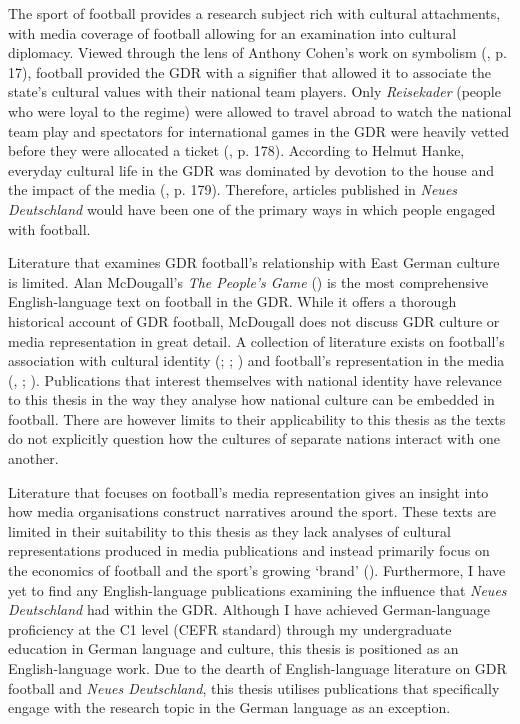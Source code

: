 The sport of football provides a research subject rich with cultural attachments, with media coverage of football allowing for an examination into cultural diplomacy. Viewed through the lens of Anthony Cohen’s work on symbolism (\cite{cohen1985}, p. 17), football provided the GDR with a signifier that allowed it to associate the state’s cultural values with their national team players. Only \textit{Reisekader} (people who were loyal to the regime) were allowed to travel abroad to watch the national team play and spectators for international games in the GDR were heavily vetted before they were allocated a ticket (\cite{mcdougall2014}, p. 178). According to Helmut Hanke, everyday cultural life in the GDR was dominated by devotion to the house and the impact of the media (\citeyear{hanke1990}, p. 179). Therefore, articles published in \textit{Neues Deutschland} would have been one of the primary ways in which people engaged with football.

Literature that examines GDR football’s relationship with East German culture is limited. Alan McDougall’s \textit{The People’s Game} (\citeyear{mcdougall2014}) is the most comprehensive English-language text on football in the GDR. While it offers a thorough historical account of GDR football, McDougall does not discuss GDR culture or media representation in great detail. A collection of literature exists on football’s association with cultural identity (\cite{archetti1994}; \cite{gibbons2014}; \cite{bocketti2016}) and football’s representation in the media (\cite{boylehaynes2004}, \cite{bridgewater2010}; \cite{miller2011}). Publications that interest themselves with national identity have relevance to this thesis in the way they analyse how national culture can be embedded in football. There are however limits to their applicability to this thesis as the texts do not explicitly question how the cultures of separate nations interact with one another.

Literature that focuses on football’s media representation gives an insight into how media organisations construct narratives around the sport. These texts are limited in their suitability to this thesis as they lack analyses of cultural representations produced in media publications and instead primarily focus on the economics of football and the sport’s growing ‘brand’ (\cite{bridgewater2010}). Furthermore, I have yet to find any English-language publications examining the influence that \textit{Neues Deutschland} had within the GDR. Although I have achieved German-language proficiency at the C1 level (CEFR standard) through my undergraduate education in German language and culture, this thesis is positioned as an English-language work. Due to the dearth of English-language literature on GDR football and \textit{Neues Deutschland}, this thesis utilises publications that specifically engage with the research topic in the German language as an exception.

